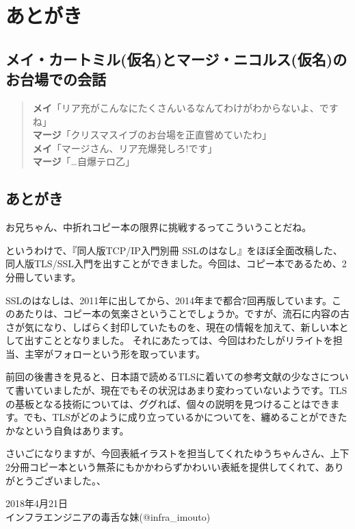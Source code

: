 \chapter{あとがき}

\section*{メイ・カートミル(仮名)とマージ・ニコルス(仮名)のお台場での会話}

\begin{quotation}
\noindent
{\bf メイ}「リア充がこんなにたくさんいるなんてわけがわからないよ、ですね」\\
{\bf マージ}「クリスマスイブのお台場を正直嘗めていたわ」 \\
{\bf メイ}「マージさん、リア充爆発しろ!です」 \\
{\bf マージ}「…自爆テロ乙」 \\
\end{quotation}

\section*{あとがき}

お兄ちゃん、中折れコピー本の限界に挑戦するってこういうことだね。

というわけで、『同人版TCP/IP入門別冊 SSLのはなし』をほぼ全面改稿した、同人版TLS/SSL入門を出すことができました。今回は、コピー本であるため、2分冊しています。

SSLのはなしは、2011年に出してから、2014年まで都合7回再版しています。このあたりは、コピー本の気楽さということでしょうか。ですが、流石に内容の古さが気になり、しばらく封印していたものを、現在の情報を加えて、新しい本として出すこととなりました。
それにあたっては、今回はわたしがリライトを担当、主宰がフォローという形を取っています。

前回の後書きを見ると、日本語で読めるTLSに着いての参考文献の少なさについて書いていましたが、現在でもその状況はあまり変わっていないようです。TLSの基板となる技術については、ググれば、個々の説明を見つけることはできます。でも、TLSがどのように成り立っているかについてを、纏めることができたかなという自負はあります。

さいごになりますが、今回表紙イラストを担当してくれたゆうちゃんさん、上下2分冊コピー本という無茶にもかかわらずかわいい表紙を提供してくれて、ありがとうございました。、

\begin{flushright}
2018年4月21日 \\
インフラエンジニアの毒舌な妹(@infra\_imouto)
\end{flushright}


